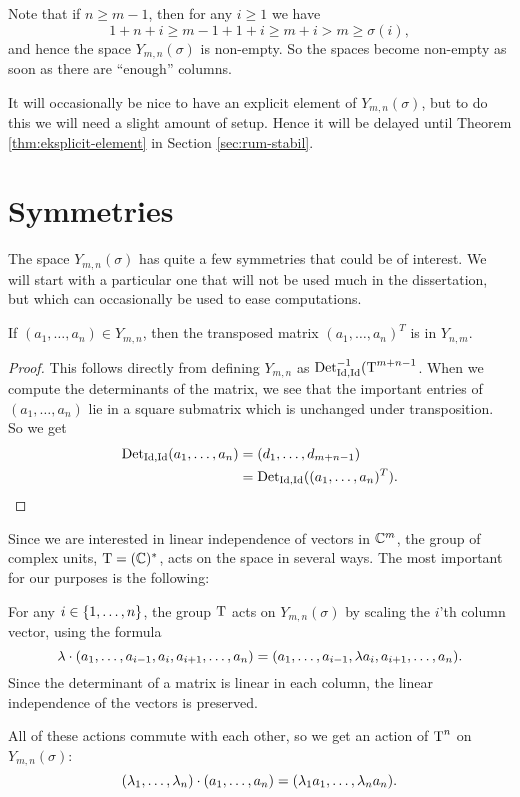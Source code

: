 \begin{remark}
  Note that if $n \geq m-1$, then for any $i\geq 1$ we have
  \[ 1 + n + i \geq m - 1 + 1 +i \geq m+i > m \geq \sigma(i), \] 
  and hence the space $Y_{m,n}(\sigma)$ is non-empty. So the spaces
  become non-empty as
  soon as there are ``enough'' columns.
\end{remark}
It will occasionally be nice to have an explicit element of
$Y_{m,n}(\sigma)$, but to do this we will need a slight amount of
setup. Hence it will be delayed until Theorem
\ref{thm:eksplicit-element} in Section \ref{sec:rum-stabil}.

\section{Symmetries}

The space $Y_{m,n}(\sigma)$ has quite a few symmetries that could be
of interest. We will start with a particular one that will not be used
much in the dissertation, but which can occasionally be used to ease
computations.
\begin{lemma}
  If $(a_1,\dots,a_n) \in Y_{m,n}$, then the transposed matrix
  $(a_1,\dots,a_n)^T$ is in $Y_{n,m}$.
\end{lemma}
\begin{proof}
  This follows directly from defining $Y_{m,n}$ as
  $\operatorname{Det}_{\operatorname{Id},\operatorname{Id}}^{-1}(\operatorname{T}^{m+n-1}$. When we compute the determinants
  of the matrix, we see that the important entries of
  $(a_1,\dots,a_n)$ lie in a square submatrix which is unchanged under
  transposition. So we get
  \begin{align*}
    \operatorname{Det}_{\operatorname{Id},\operatorname{Id}}(a_1,\dots,a_n) &= (d_1,\dots,d_{m+n-1}) \\
    &= \operatorname{Det}_{\operatorname{Id},\operatorname{Id}}( (a_1,\dots,a_n)^T ).
  \end{align*}
\end{proof}

Since we are interested in linear independence of vectors in $\mathbb{C}^m$,
the group of complex units, $\operatorname{T}=(\mathbb{C})^*$, acts on the space 
in several ways. The 
most important for our purposes is the following:
\begin{definition}
  For any $i \in \left\{ 1,\dots,n \right\}$, the group $\operatorname{T}$ acts
  on $Y_{m,n}(\sigma)$ by scaling the $i$'th column vector,
  using the formula
  \[ \lambda \cdot (a_1,\dots,a_{i-1},a_i,a_{i+1},\dots,a_n) =
  (a_1,\dots,a_{i-1},\lambda a_i,a_{i+1},\dots,a_n). \]
  Since the determinant of a matrix is linear in each column, the
  linear independence of the vectors is preserved.

  All of these actions commute with each other, so we get an action of
  $\operatorname{T}^n$ on $Y_{m,n}(\sigma)$:
  \[ (\lambda_1,\dots,\lambda_n) \cdot (a_1,\dots,a_n) = (\lambda_1 a_1,\dots, \lambda_n
  a_n). \]
\end{definition}

